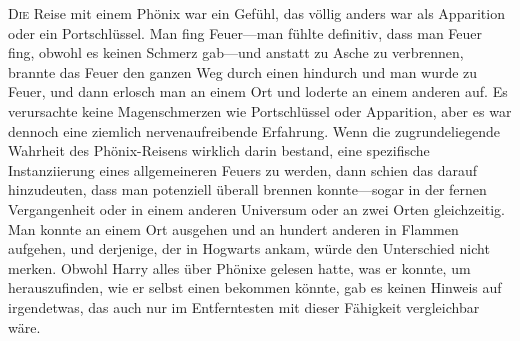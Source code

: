 
\lettrine{D}{ie} Reise mit einem Phönix war ein Gefühl, das völlig anders war als Apparition oder ein Portschlüssel. Man fing Feuer—man fühlte definitiv, dass man Feuer fing, obwohl es keinen Schmerz gab—und anstatt zu Asche zu verbrennen, brannte das Feuer den ganzen Weg durch einen hindurch und man wurde zu Feuer, und dann erlosch man an einem Ort und loderte an einem anderen auf. Es verursachte keine Magenschmerzen wie Portschlüssel oder Apparition, aber es war dennoch eine ziemlich nervenaufreibende Erfahrung. Wenn die zugrundeliegende Wahrheit des Phönix-Reisens wirklich darin bestand, eine spezifische Instanziierung eines allgemeineren Feuers zu werden, dann schien das darauf hinzudeuten, dass man potenziell überall brennen konnte—sogar in der fernen Vergangenheit oder in einem anderen Universum oder an zwei Orten gleichzeitig. Man konnte an einem Ort ausgehen und an hundert anderen in Flammen aufgehen, und derjenige, der in Hogwarts ankam, würde den Unterschied nicht merken. Obwohl Harry alles über Phönixe gelesen hatte, was er konnte, um herauszufinden, wie er selbst einen bekommen könnte, gab es keinen Hinweis auf irgendetwas, das auch nur im Entferntesten mit dieser Fähigkeit vergleichbar wäre.

